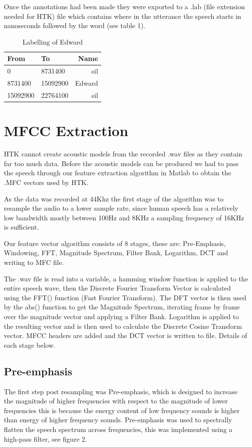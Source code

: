 \documentclass[	DIV=calc,%
							paper=a4,%
							fontsize=9.8pt,%
							twocolumn]{scrartcl}	 					%
\begin{document}
Once the annotations had been made they were exported to a .lab (file extension needed for HTK) file which contains where in the utterance the speech starts in nanoseconds followed by the word (see table 1). 
\begin{table}[h]
	\caption{Labelling of Edward}
	\centering
	\begin{tabular}{llr}
	
		\cmidrule(r){1-3}
		From & To & Name \\
		\midrule
		0 & 8731400 & sil \\
		8731400  & 15092900  & Edward \\
		15092900   & 22764100  & sil \\
	
	\end{tabular}
\end{table}


\section{MFCC Extraction}
HTK cannot create acoustic models from the recorded .wav files as they contain far too much data. Before the acoustic models can be produced we had to pass the speech through our feature extraction algorithm in Matlab to obtain the .MFC vectors used by HTK.

As the data was recorded at 44Khz the first stage of the algorithm was to resample the audio to a lower sample rate, since human speech has a relatively low bandwidth mostly between 100Hz and 8KHz a sampling frequency of 16KHz is sufficient.  

Our feature vector algorithm consists of 8 stages, these are: Pre-Emphasis, Windowing, FFT, Magnitude Spectrum, Filter Bank, Logarithm, DCT and writing to MFC file. 

The .wav file is read into a variable, a hamming window function is applied to the entire speech wave, then the Discrete Fourier Transform Vector is calculated using the FFT() function (Fast Fourier Transform). The DFT vector is then used by the abs() function to get the Magnitude Spectrum, iterating frame by frame over the 
magnitude vector and applying a Filter Bank. Logarithm is applied to the resulting vector and is then used to calculate the Discrete Cosine Transform vector. MFCC headers are added and the DCT vector is written to file. Details of each stage below. 


\subsection{Pre-emphasis}
The first step post resampling was Pre-emphasis, which is designed to increase the magnitude of higher frequencies with respect to the magnitude of lower frequencies this is because the energy content of low frequency sounds is higher than energy of higher frequency sounds. Pre-emphasis was used to spectrally flatten the speech spectrum across frequencies, this was implemented using a high-pass filter, see figure 2.
\end{document}
